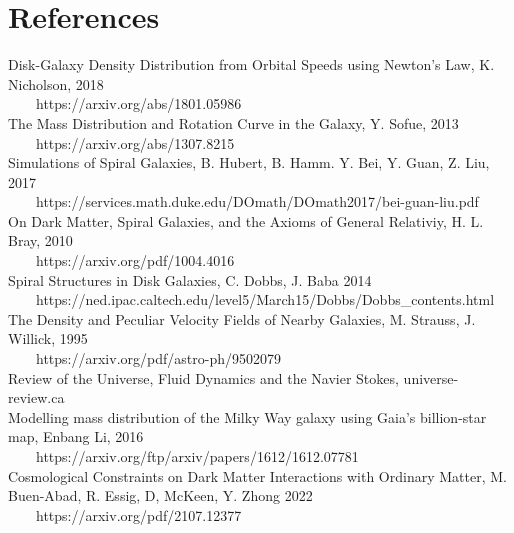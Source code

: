 \documentclass[11pt]{article}
\begin{document}
\section{References}
\begin{tabbing}
Disk-Galaxy Density Distribution from Orbital Speeds using Newton's Law, K. Nicholson, 2018\\[0\baselineskip]
\ \ \ \ https://arxiv.org/abs/1801.05986\\[0\baselineskip]
The Mass Distribution and Rotation Curve in the Galaxy, Y. Sofue, 2013\\[0\baselineskip]
\ \ \ \ https://arxiv.org/abs/1307.8215\\[0\baselineskip]
Simulations of Spiral Galaxies, B. Hubert, B. Hamm. Y. Bei, Y. Guan, Z. Liu, 2017\\[0\baselineskip]
\ \ \ \ https://services.math.duke.edu/DOmath/DOmath2017/bei-guan-liu.pdf\\[0\baselineskip]
On Dark Matter, Spiral Galaxies, and the Axioms of General Relativiy, H. L. Bray, 2010\\[0\baselineskip]
\ \ \ \ https://arxiv.org/pdf/1004.4016\\[0\baselineskip]
Spiral Structures in Disk Galaxies, C. Dobbs, J. Baba 2014\\[0\baselineskip]
\ \ \ \ https://ned.ipac.caltech.edu/level5/March15/Dobbs/Dobbs\_contents.html\\[0\baselineskip]
The Density and Peculiar Velocity Fields of Nearby Galaxies, M. Strauss, J. Willick, 1995\\[0\baselineskip]
\ \ \ \ https://arxiv.org/pdf/astro-ph/9502079\\[0\baselineskip]
Review of the Universe, Fluid Dynamics and the Navier Stokes, universe-review.ca\\[0\baselineskip]
Modelling mass distribution of the Milky Way galaxy using Gaia’s billion-star map, Enbang Li, 2016\\[0\baselineskip]
\ \ \ \  https://arxiv.org/ftp/arxiv/papers/1612/1612.07781\\[0\baselineskip]
Cosmological Constraints on Dark Matter Interactions with Ordinary Matter, M. Buen-Abad, R. Essig, D, McKeen, Y. Zhong 2022\\[0\baselineskip]
\ \ \ \  https://arxiv.org/pdf/2107.12377
\end{tabbing}
\end{document}
